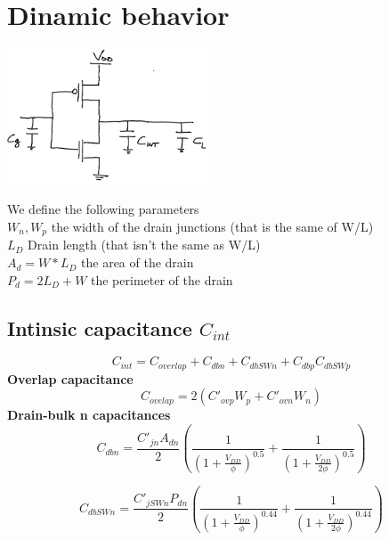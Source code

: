 \section{Dinamic behavior}


\centering
\includegraphics[width=0.45\textwidth]{C3_10.png}\\
\raggedright

We define the following parameters \\
\tab $W_n,W_p$ the width of the drain junctions (that is the same of W/L)\\
\tab $L_D$ Drain length (that isn't the same as W/L)\\
\tab $A_{d}=W*L_D$ the area of the drain\\
\tab $P_{d}=2L_D+W$ the perimeter of the drain\\


\subsection{Intinsic capacitance $C_{int}$}
\vspace{2mm}
\begin{equation}
C_{int}=C_{overlap}+C_{dbn}+C_{dbSWn}+C_{dbp}C_{dbSWp}
\end{equation}
{\bf Overlap capacitance}\\
\begin{equation}
C_{ovelap}=2(C'_{ovp}W_p+C'_{ovn}W_n)
\end{equation}
\vspace{5mm}
{\bf Drain-bulk n capacitances}
\begin{equation}
C_{dbn}=\frac{C'_{jn}A_{dn}}{2}\left(\frac{1}{(1+\frac{V_{DD}}{\phi})^{0.5}}+\frac{1}{(1+\frac{V_{DD}}{2\phi})^{0.5}}  \right)
\end{equation}

\begin{equation}
C_{dbSWn}=\frac{C'_{jSWn}P_{dn}}{2}\left(\frac{1}{(1+\frac{V_{DD}}{\phi})^{0.44}}+\frac{1}{(1+\frac{V_{DD}}{2\phi})^{0.44}}  \right)
\end{equation}


